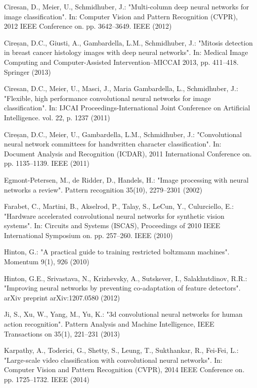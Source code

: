 \documentclass{article}
\begin{document}
\begin{thebibliography}{99}
 Ciresan, D., Meier, U., Schmidhuber, J.: "Multi-column deep neural networks for image classification". In: Computer Vision and Pattern Recognition (CVPR), 2012 IEEE Conference on. pp. 3642–3649. IEEE (2012)

 Cireșan, D.C., Giusti, A., Gambardella, L.M., Schmidhuber, J.: "Mitosis detection in breast cancer histology images with deep neural networks". In: Medical Image Computing and Computer-Assisted Intervention–MICCAI 2013, pp. 411–418. Springer (2013)

 Ciresan, D.C., Meier, U., Masci, J., Maria Gambardella, L., Schmidhuber, J.: "Flexible, high performance convolutional neural networks for image classification". In: IJCAI Proceedings-International Joint Conference on Artificial Intelligence. vol. 22, p. 1237 (2011)

 Cireșan, D.C., Meier, U., Gambardella, L.M., Schmidhuber, J.: "Convolutional neural network committees for handwritten character classification". In: Document Analysis and Recognition (ICDAR), 2011 International Conference on. pp. 1135–1139. IEEE (2011)

 Egmont-Petersen, M., de Ridder, D., Handels, H.: "Image processing with neural networks a review". Pattern recognition 35(10), 2279–2301 (2002)

 Farabet, C., Martini, B., Akselrod, P., Talay, S., LeCun, Y., Culurciello, E.: "Hardware accelerated convolutional neural networks for synthetic vision systems". In: Circuits and Systems (ISCAS), Proceedings of 2010 IEEE International Symposium on. pp. 257–260. IEEE (2010)

 Hinton, G.: "A practical guide to training restricted boltzmann machines". Momentum 9(1), 926 (2010)

 Hinton, G.E., Srivastava, N., Krizhevsky, A., Sutskever, I., Salakhutdinov, R.R.: "Improving neural networks by preventing co-adaptation of feature detectors". arXiv preprint arXiv:1207.0580 (2012)

 Ji, S., Xu, W., Yang, M., Yu, K.: "3d convolutional neural networks for human action recognition". Pattern Analysis and Machine Intelligence, IEEE Transactions on 35(1), 221–231 (2013)

 Karpathy, A., Toderici, G., Shetty, S., Leung, T., Sukthankar, R., Fei-Fei, L.: "Large-scale video classification with convolutional neural networks". In: Computer Vision and Pattern Recognition (CVPR), 2014 IEEE Conference on. pp. 1725–1732. IEEE (2014)


\end{thebibliography}
\end{document}
